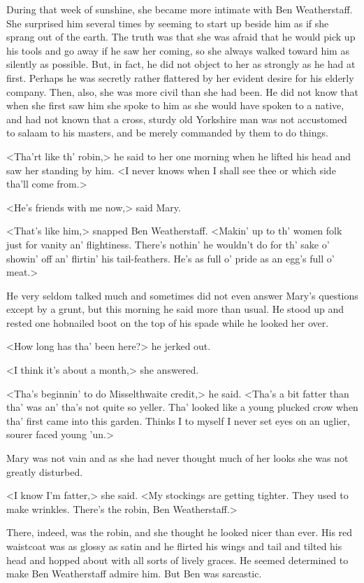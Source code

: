 During that week of sunshine, she became more intimate with Ben Weatherstaff. She surprised him several times by seeming to start up beside him as if she sprang out of the earth. The truth was that she was afraid that he would pick up his tools and go away if he saw her coming, so she always walked toward him as silently as possible. But, in fact, he did not object to her as strongly as he had at first. Perhaps he was secretly rather flattered by her evident desire for his elderly company. Then, also, she was more civil than she had been. He did not know that when she first saw him she spoke to him as she would have spoken to a native, and had not known that a cross, sturdy old Yorkshire man was not accustomed to salaam to his masters, and be merely commanded by them to do things.

<Tha'rt like th' robin,> he said to her one morning when he lifted his head and saw her standing by him. <I never knows when I shall see thee or which side tha'll come from.>

<He's friends with me now,> said Mary.

<That's like him,> snapped Ben Weatherstaff. <Makin' up to th' women folk just for vanity an' flightiness. There's nothin' he wouldn't do for th' sake o' showin' off an' flirtin' his tail-feathers. He's as full o' pride as an egg's full o' meat.>

He very seldom talked much and sometimes did not even answer Mary's questions except by a grunt, but this morning he said more than usual. He stood up and rested one hobnailed boot on the top of his spade while he looked her over.

<How long has tha' been here?> he jerked out.

<I think it's about a month,> she answered.

<Tha's beginnin' to do Misselthwaite credit,> he said. <Tha's a bit fatter than tha' was an' tha's not quite so yeller. Tha' looked like a young plucked crow when tha' first came into this garden. Thinks I to myself I never set eyes on an uglier, sourer faced young 'un.>

Mary was not vain and as she had never thought much of her looks she was not greatly disturbed.

<I know I'm fatter,> she said. <My stockings are getting tighter. They used to make wrinkles. There's the robin, Ben Weatherstaff.>

There, indeed, was the robin, and she thought he looked nicer than ever. His red waistcoat was as glossy as satin and he flirted his wings and tail and tilted his head and hopped about with all sorts of lively graces. He seemed determined to make Ben Weatherstaff admire him. But Ben was sarcastic.

